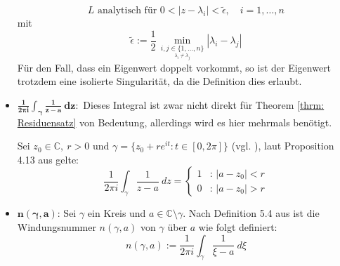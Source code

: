 \documentclass[a4paper,12pt]{report}
\newcommand{\C}{\mathbb C}
\newcommand{\1}{\mathds{1}}
\theoremstyle{plain} %
\theoremstyle{definition} %
\theoremstyle{remark}
\begin{document}
\begin{itemize}
                        \begin{equation}
                              \label{hilfe: complexAnalysis_isolierteSingularitäten}
                              L \text{ analytisch für } 0<|z-\lambda_i|<\widetilde{\epsilon},\quad i=1,\dots,n
                        \end{equation}
                        mit
                        $$\widetilde{\epsilon}:= \frac{1}{2}\,\min_{\underset{\lambda_i\ne \lambda_j}{i,j\in \{1,\dots,n\}} } |\lambda_i-\lambda_j|$$
                        Für den Fall, dass ein Eigenwert doppelt vorkommt, so ist der Eigenwert trotzdem eine isolierte Singularität,
                        da die Definition dies erlaubt.
                  \item $\mathbf{\frac{1}{2\pi i}\int_{\gamma} \frac 1 {z-a}\ dz:}$
                        Dieses Integral ist zwar nicht direkt für Theorem \ref{thrm: Residuensatz} von Bedeutung, allerdings wird es hier mehrmals benötigt.

                        Sei $z_0\in\C,\ r>0\text{ und }\gamma=\{z_0+r e^{it}: t\in [0,2\pi]\}$ (vgl. \cite[S. 48]{complexAnalysis}),
                        laut Proposition 4.13 aus \cite[S. 48]{complexAnalysis} gelte:
                        \begin{equation}
                              \label{hilfe: complexAnalysis_IntegralEinsDurchX}
                              \frac{1}{2\pi i}\int_\gamma \frac 1 {z-a}\ dz = \begin{cases}
                                    1 & \text{: } |a-z_0|<r \\
                                    0 & \text{: } |a-z_0|>r
                                    \end{cases}
                        \end{equation}
                  \item $\mathbf{n(\gamma, a)}$:
                        Sei $\gamma$ ein Kreis und $a\in \C\setminus \gamma$.
                        Nach Definition 5.4 aus \cite[S. 65]{complexAnalysis} ist die Windungsnummer $n(\gamma,a)$ von $\gamma$ über $a$ wie folgt definiert:
                        $$n(\gamma,a):= \frac{1}{2\pi i}\int_\gamma \frac{1}{\xi-a}\ d\xi$$


\end{itemize}
\end{document}
